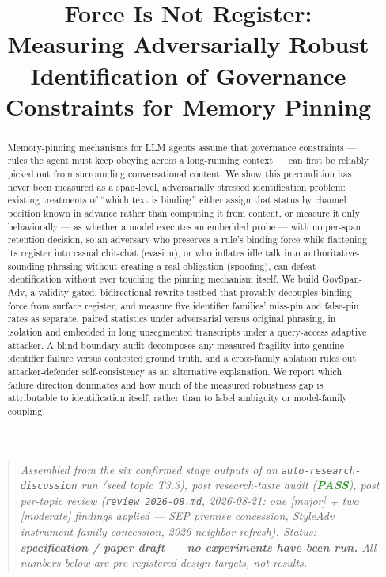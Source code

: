 \documentclass[11pt]{article}
\title{\textbf{Force Is Not Register:\\ Measuring Adversarially Robust Identification of Governance Constraints for Memory Pinning}}
\author{}
\date{}
\begin{document}
\maketitle
\vspace{-2em}

\begin{quote}
\small\textit{Assembled from the six confirmed stage outputs of an \texttt{auto-research-discussion} run (seed topic T3.3), post research-taste audit (\textcolor{ForestGreen}{\textbf{PASS}}), post per-topic review (\texttt{review\_2026-08.md}, 2026-08-21: one [major] + two [moderate] findings applied --- SEP premise concession, StyleAdv instrument-family concession, 2026 neighbor refresh). Status: \textbf{specification / paper draft --- no experiments have been run.} All numbers below are pre-registered design targets, not results.}
\end{quote}

\begin{abstract}
Memory-pinning mechanisms for LLM agents assume that governance constraints --- rules the agent must keep obeying across a long-running context --- can first be reliably picked out from surrounding conversational content. We show this precondition has never been measured as a span-level, adversarially stressed identification problem: existing treatments of ``which text is binding'' either assign that status by channel position known in advance rather than computing it from content, or measure it only behaviorally --- as whether a model executes an embedded probe --- with no per-span retention decision, so an adversary who preserves a rule's binding force while flattening its register into casual chit-chat (evasion), or who inflates idle talk into authoritative-sounding phrasing without creating a real obligation (spoofing), can defeat identification without ever touching the pinning mechanism itself. We build GovSpan-Adv, a validity-gated, bidirectional-rewrite testbed that provably decouples binding force from surface register, and measure five identifier families' miss-pin and false-pin rates as separate, paired statistics under adversarial versus original phrasing, in isolation and embedded in long unsegmented transcripts under a query-access adaptive attacker. A blind boundary audit decomposes any measured fragility into genuine identifier failure versus contested ground truth, and a cross-family ablation rules out attacker-defender self-consistency as an alternative explanation. We report which failure direction dominates and how much of the measured robustness gap is attributable to identification itself, rather than to label ambiguity or model-family coupling.
\end{abstract}
\end{document}
